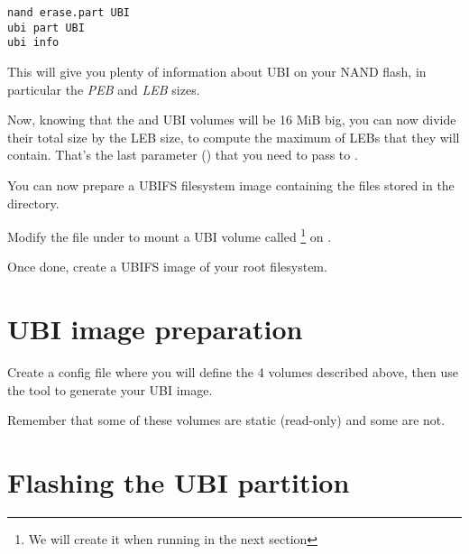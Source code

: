 \begin{verbatim}
nand erase.part UBI
ubi part UBI
ubi info
\end{verbatim}

This will give you plenty of information about UBI on your NAND flash,
in particular the {\em PEB} and {\em LEB} sizes.

Now, knowing that the  and  UBI volumes will be 16
MiB big, you can now divide their total size by the LEB size, to compute
the maximum of LEBs that they will contain. That's the last parameter
() that you need to pass to .

You can now prepare a UBIFS filesystem image containing the files
stored in the  directory.

Modify the  file under  to mount a
UBI volume called  \footnote{We will create it when
running  in the next section} on .

Once done, create a UBIFS image of your root filesystem.

\section{UBI image preparation}

Create a  config file where you will define the 4 volumes
described above, then use the  tool to generate your
UBI image.

Remember that some of these volumes are static (read-only) and some are
not.

%
%

%
%
%
%
%
%

%
%
%

\section{Flashing the UBI partition}

